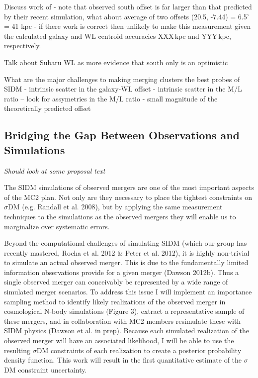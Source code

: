 {Discuss work of \citep{Kahlhoefer:2013wp}
- note that observed south offset is far larger than that predicted by their recent simulation, what about average of two offsets (20.5, -7.44) = 6.5' = 41 kpc
- if there work is correct then unlikely to make this measurement given the calculated galaxy and WL centroid accuracies XXX\,kpc and YYY\,kpc, respectively.





Talk about Subaru WL as more evidence that south only is an optimistic


What are the major challenges to making merging clusters the best probes of SIDM
- intrinsic scatter in the galaxy-WL offset
- intrinsic scatter in the M/L ratio
-- look for assymetries in the M/L ratio
- small magnitude of the theoretically predicted offset





\subsection{Bridging the Gap Between Observations and Simulations}

\textit{Should look at some proposal text}

The SIDM simulations of observed mergers are one of the most important aspects of the MC2 plan.  Not only are they necessary to place the tightest constraints on $\sigma$DM  (e.g. Randall et al. 2008), but by applying the same measurement techniques to the simulations as the observed mergers they will enable us to marginalize over systematic errors.  

Beyond the computational challenges of simulating SIDM (which our group has recently mastered, Rocha et al. 2012 \& Peter et al. 2012), it is highly non-trivial to simulate an actual observed merger. This is due to the fundamentally limited information observations provide for a given merger (Dawson 2012b). Thus a single observed merger can conceivably be represented by a wide range of simulated merger scenarios. To address this issue I will implement an importance sampling method to identify likely realizations of the observed merger in cosmological N-body simulations (Figure 3), extract a representative sample of these mergers, and in collaboration with MC2 members resimulate these with SIDM physics (Dawson et al. in prep).  Because each simulated realization of the observed merger will have an associated likelihood, I will be able to use the resulting $\sigma$DM  constraints of each realization to create a posterior probability density function.  This work will result in the first quantitative estimate of the $\sigma$DM  constraint uncertainty. 

}
